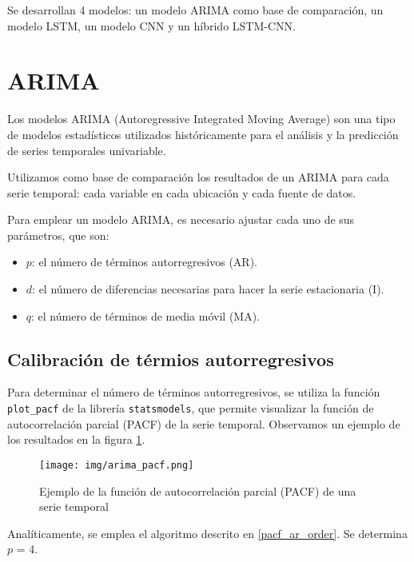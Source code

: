 Se desarrollan 4 modelos: un modelo ARIMA como base de comparación, un modelo LSTM, un modelo CNN y un híbrido LSTM-CNN.

\section{ARIMA}
Los modelos ARIMA (Autoregressive Integrated Moving Average) son una tipo de modelos estadísticos utilizados históricamente para el análisis y la predicción de series temporales
univariable. 

Utilizamos como base de comparación los resultados de un ARIMA para cada serie temporal: cada variable en cada ubicación y cada fuente de datos.

Para emplear un modelo ARIMA, es necesario ajustar cada uno de sus parámetros, que son:
\begin{itemize}
    \item $p$: el número de términos autorregresivos (AR).
    \item $d$: el número de diferencias necesarias para hacer la serie estacionaria (I).
    \item $q$: el número de términos de media móvil (MA).
\end{itemize}

\subsection{Calibración de térmios autorregresivos}
Para determinar el número de términos autorregresivos, se utiliza la función \texttt{plot\_pacf} de la librería \texttt{statsmodels}, 
que permite visualizar la función de autocorrelación parcial (PACF) de la serie temporal. Observamos un ejemplo de los resultados en la figura \ref{arima_pacf}. 

\begin{figure}[H]
\centering
\texttt{[image: img/arima\_pacf.png]}
\caption{Ejemplo de la función de autocorrelación parcial (PACF) de una serie temporal}
\label{arima_pacf}
\end{figure}

Analíticamente, se emplea el algoritmo descrito en \ref{pacf_ar_order}. Se determina $p$ = 4.

